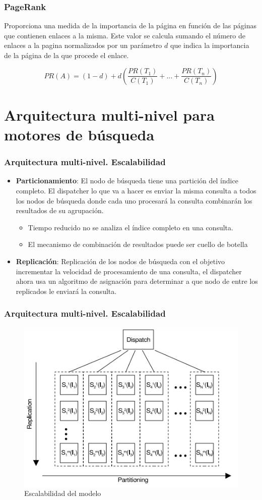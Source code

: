 \documentclass[9pt]{beamer} %
\begin{document}
\begin{frame}
	\frametitle{PageRank}
Proporciona una medida de la importancia de la página en función de las páginas que contienen enlaces a la misma. Este valor se calcula sumando el número de enlaces a la pagina normalizados por un parámetro $d$ que indica la importancia de la página de la que procede el enlace.

\[
PR(A)=(1-d)+d(\frac{PR(T_1)}{C(T_1)}+...+\frac{PR(T_n)}{C(T_n)})
\]
\end{frame}
\section{Arquitectura multi-nivel para motores de búsqueda}

\begin{frame}
	\frametitle{Arquitectura multi-nivel. Escalabilidad}
	\begin{itemize}
		\item \textbf{Particionamiento}: El nodo de búsqueda tiene una partición del índice completo. El dispatcher lo que va a hacer es enviar la misma consulta a todos los nodos de búsqueda donde cada uno procesará la consulta combinarán los resultados de su agrupación.
		\begin{itemize}
			\item Tiempo reducido no se analiza el índice completo en una consulta.
			\item El mecanismo de combinación de resultados puede ser cuello de botella
		\end{itemize}
		\item \textbf{Replicación}: Replicación de los nodos de búsqueda con el objetivo incrementar la velocidad de procesamiento de una consulta, el dispatcher ahora usa un algoritmo de asignación para determinar a que nodo de entre los replicados le enviará la consulta.
	\end{itemize}
\end{frame}
\begin{frame}
	\frametitle{Arquitectura multi-nivel. Escalabilidad}
	\begin{figure}[H]
			\centering
			\includegraphics[scale=0.75]{./img/multitier.png}
			\caption{Escalabilidad del modelo}
			\label{fig:my_label}
	\end{figure}
\end{frame}
\end{document}
